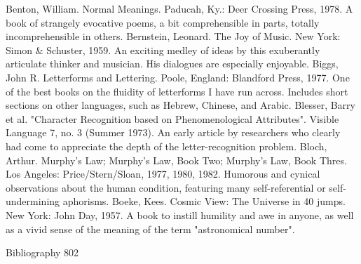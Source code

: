 Benton, William. Normal Meanings. Paducah, Ky.: Deer Crossing Press, 1978. A book of
 strangely evocative poems, a bit comprehensible in parts, totally incomprehensible in
 others.
Bernstein, Leonard. The Joy of Music. New York: Simon \& Schuster, 1959. An exciting
 medley of ideas by this exuberantly articulate thinker and musician. His dialogues are
 especially enjoyable.
Biggs, John R. Letterforms and Lettering. Poole, England: Blandford Press, 1977. One of the
 best books on the fluidity of letterforms I have run across. Includes short sections on other
 languages, such as Hebrew, Chinese, and Arabic.
Blesser, Barry et al. "Character Recognition based on Phenomenological Attributes". Visible
 Language 7, no. 3 (Summer 1973). An early article by researchers who clearly had come to
 appreciate the depth of the letter-recognition problem.
Bloch, Arthur. Murphy's Law; Murphy's Law, Book Two; Murphy's Law, Book Thres. Los
 Angeles: Price/Stern/Sloan, 1977, 1980, 1982. Humorous and cynical observations about
 the human condition, featuring many self-referential or self-undermining aphorisms.
Boeke, Kees. Cosmic View: The Universe in 40 jumps. New York: John Day, 1957. A book
 to instill humility and awe in anyone, as well as a vivid sense of the meaning of the term
 "astronomical number".

Bibliography                                                                                 802

